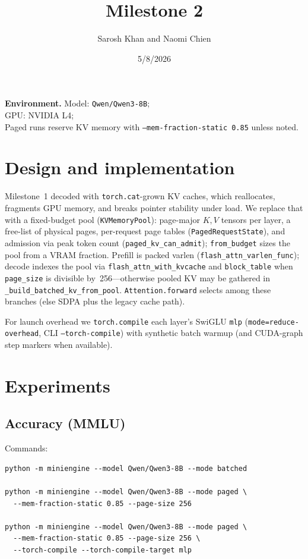 \documentclass[11pt]{article}
\title{Milestone 2}
\author{Sarosh Khan and Naomi Chien}
\date{5/8/2026}
\begin{document}
\maketitle

\noindent\textbf{Environment.}
Model: \texttt{Qwen/Qwen3-8B};\\
GPU: NVIDIA L4;\\
Paged runs reserve KV memory with \texttt{--mem-fraction-static 0.85} unless noted.

\section{Design and implementation}

Milestone~1 decoded with \texttt{torch.cat}-grown KV caches, which reallocates, fragments GPU memory, and breaks pointer stability under load.
We replace that with a fixed-budget pool (\texttt{KVMemoryPool}): page-major \(K,V\) tensors per layer, a free-list of physical pages, per-request page tables (\texttt{PagedRequestState}), and admission via peak token count (\texttt{paged\_kv\_can\_admit}); \texttt{from\_budget} sizes the pool from a VRAM fraction.
Prefill is packed varlen (\texttt{flash\_attn\_varlen\_func}); decode indexes the pool via \texttt{flash\_attn\_with\_kvcache} and \texttt{block\_table} when \texttt{page\_size} is divisible by~256---otherwise pooled KV may be gathered in \texttt{\_build\_batched\_kv\_from\_pool}.
\texttt{Attention.forward} selects among these branches (else SDPA plus the legacy cache path).

For launch overhead we \texttt{torch.compile} each layer's SwiGLU \texttt{mlp} (\texttt{mode=reduce-overhead}, CLI \texttt{--torch-compile}) with synthetic batch warmup (and CUDA-graph step markers when available).

\section{Experiments}

\subsection{Accuracy (MMLU)}

\noindent Commands:
\begin{verbatim}
python -m miniengine --model Qwen/Qwen3-8B --mode batched

python -m miniengine --model Qwen/Qwen3-8B --mode paged \
  --mem-fraction-static 0.85 --page-size 256

python -m miniengine --model Qwen/Qwen3-8B --mode paged \
  --mem-fraction-static 0.85 --page-size 256 \
  --torch-compile --torch-compile-target mlp
\end{verbatim}
\end{document}
